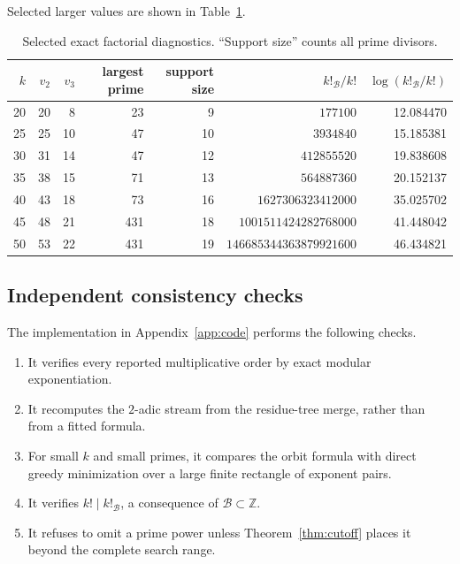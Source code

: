 \documentclass[11pt,oneside]{article}
\theoremstyle{definition}
\theoremstyle{remark}
\newcommand{\Z}{\mathbb Z}
\newcommand{\B}{\mathcal B}
\begin{document}
Selected larger values are shown in Table~\ref{tab:selected-factorials}.

\begin{table}[ht]
\centering
\small
\begin{tabular}{@{}r r r r r r r@{}}
\toprule
\(k\)&\(v_2\)&\(v_3\)&largest prime&support size&\(k!_{\B}/k!\)&
\(\log(k!_{\B}/k!)\)\\
\midrule
20 & 20 & 8 & 23 & 9 & $177100$ & 12.084470 \\
25 & 25 & 10 & 47 & 10 & $3934840$ & 15.185381 \\
30 & 31 & 14 & 47 & 12 & $412855520$ & 19.838608 \\
35 & 38 & 15 & 71 & 13 & $564887360$ & 20.152137 \\
40 & 43 & 18 & 73 & 16 & $1627306323412000$ & 35.025702 \\
45 & 48 & 21 & 431 & 18 & $1001511424282768000$ & 41.448042 \\
50 & 53 & 22 & 431 & 19 & $146685344363879921600$ & 46.434821 \\
\bottomrule
\end{tabular}
\caption{Selected exact factorial diagnostics.  ``Support size'' counts all prime divisors.}
\label{tab:selected-factorials}
\end{table}

\subsection{Independent consistency checks}

The implementation in Appendix~\ref{app:code} performs the following checks.

\begin{enumerate}
\item It verifies every reported multiplicative order by exact modular exponentiation.
\item It recomputes the \(2\)-adic stream from the residue-tree merge, rather than from a
fitted formula.
\item For small \(k\) and small primes, it compares the orbit formula with direct greedy
minimization over a large finite rectangle of exponent pairs.
\item It verifies \(k!\mid k!_{\B}\), a consequence of \(\B\subset\Z\).
\item It refuses to omit a prime power unless Theorem~\ref{thm:cutoff} places it beyond the
complete search range.
\end{enumerate}
\end{document}
